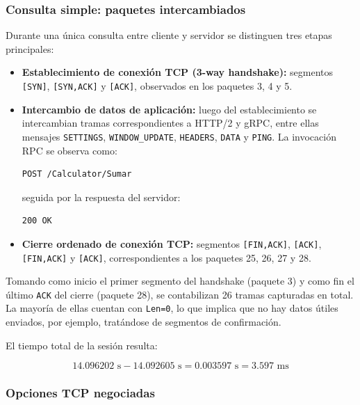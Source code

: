 \documentclass[a4paper,12pt]{article}
\begin{document}
\subsubsection{Consulta simple: paquetes intercambiados}

Durante una única consulta entre cliente y servidor se distinguen tres etapas principales:

\begin{itemize}
    \item \textbf{Establecimiento de conexión TCP (3-way handshake):} segmentos \texttt{[SYN]}, \texttt{[SYN,ACK]} y \texttt{[ACK]}, observados en los paquetes 3, 4 y 5.
    
    \item \textbf{Intercambio de datos de aplicación:} luego del establecimiento se intercambian tramas correspondientes a HTTP/2 y gRPC, entre ellas mensajes \texttt{SETTINGS}, \texttt{WINDOW\_UPDATE}, \texttt{HEADERS}, \texttt{DATA} y \texttt{PING}. La invocación RPC se observa como:
    
\begin{verbatim}
POST /Calculator/Sumar
\end{verbatim}

seguida por la respuesta del servidor:

\begin{verbatim}
200 OK
\end{verbatim}

    \item \textbf{Cierre ordenado de conexión TCP:} segmentos \texttt{[FIN,ACK]}, \texttt{[ACK]}, \texttt{[FIN,ACK]} y \texttt{[ACK]}, correspondientes a los paquetes 25, 26, 27 y 28.
\end{itemize}

Tomando como inicio el primer segmento del handshake (paquete 3) y como fin el último \texttt{ACK} del cierre (paquete 28), se contabilizan 26 tramas capturadas en total. La mayoría de ellas cuentan con \texttt{Len=0}, lo que implica que no hay datos útiles enviados, por ejemplo, tratándose de segmentos de confirmación.

El tiempo total de la sesión resulta:

\[
14.096202 \text{ s} - 14.092605 \text{ s} = 0.003597 \text{ s} = 3.597 \text{ ms}
\]

\subsubsection{Opciones TCP negociadas}
\end{document}
